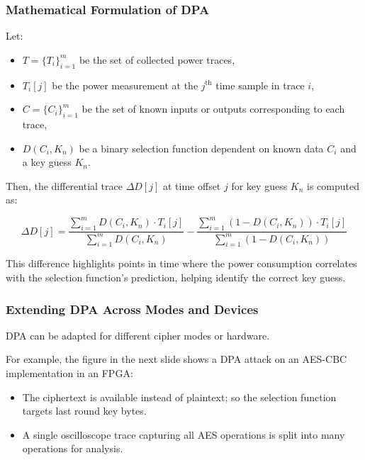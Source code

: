 \begin{frame}
    \frametitle{Mathematical Formulation of DPA}

    Let:
    \begin{itemize}
        \item $T = \{T_i\}_{i=1}^m$ be the set of collected power traces,
        \item $T_i[j]$ be the power measurement at the $j^\text{th}$ time sample in trace $i$,
        \item $C = \{C_i\}_{i=1}^m$ be the set of known inputs or outputs corresponding to each trace,
        \item $D(C_i, K_n)$ be a binary selection function dependent on known data $C_i$ and a key guess $K_n$.
    \end{itemize}

    Then, the differential trace $\Delta D[j]$ at time offset $j$ for key guess $K_n$ is computed as:

    \[
        \Delta D[j] = 
        \frac{
            \sum_{i=1}^m D(C_i, K_n) \cdot T_i[j]
        }{
            \sum_{i=1}^m D(C_i, K_n)
        }
        -
        \frac{
            \sum_{i=1}^m (1 - D(C_i, K_n)) \cdot T_i[j]
        }{
            \sum_{i=1}^m (1 - D(C_i, K_n))
        }
    \]

    This difference highlights points in time where the power consumption correlates with the selection function’s prediction, helping identify the correct key guess.
\end{frame}


\begin{frame}
    \frametitle{Extending DPA Across Modes and Devices}

    DPA can be adapted for different cipher modes or hardware.

    For example, the figure in the next slide shows a DPA attack on an AES-CBC implementation in an FPGA:

    \begin{itemize}
        \item The ciphertext is available instead of plaintext; so the selection function targets last round key bytes.
        \item A single oscilloscope trace capturing all AES operations is split into many operations for analysis.
    \end{itemize}
\end{frame}

